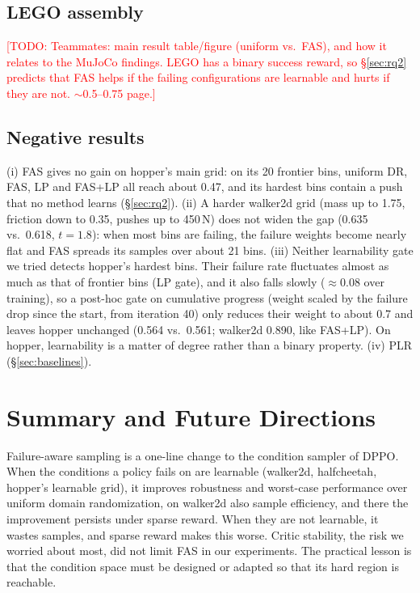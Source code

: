 \documentclass{article}
\newcommand{\todo}[1]{\textcolor{red}{[TODO: #1]}}
\newcommand{\fas}{\textsc{FAS}}
\begin{document}
\subsection{LEGO assembly}
\label{sec:lego}
\todo{Teammates: main result table/figure (uniform vs.\ \fas{}), and how it relates to the MuJoCo findings. LEGO has a binary success reward, so \S\ref{sec:rq2} predicts that \fas{} helps if the failing configurations are learnable and hurts if they are not. $\sim$0.5--0.75 page.}

\subsection{Negative results}
\label{sec:negative}
(i) \fas{} gives no gain on hopper's main grid: on its 20 frontier bins, uniform DR, \fas{}, LP and \fas{}+LP all reach about 0.47, and its hardest bins contain a push that no method learns (\S\ref{sec:rq2}).
(ii) A harder walker2d grid (mass up to 1.75, friction down to 0.35, pushes up to 450\,N) does not widen the gap (0.635 vs.\ 0.618, $t=1.8$): when most bins are failing, the failure weights become nearly flat and \fas{} spreads its samples over about 21 bins.
(iii) Neither learnability gate we tried detects hopper's hardest bins. Their failure rate fluctuates almost as much as that of frontier bins (LP gate), and it also falls slowly ($\approx$0.08 over training), so a post-hoc gate on cumulative progress (weight scaled by the failure drop since the start, from iteration 40) only reduces their weight to about 0.7 and leaves hopper unchanged (0.564 vs.\ 0.561; walker2d 0.890, like \fas{}+LP). On hopper, learnability is a matter of degree rather than a binary property.
(iv) PLR (\S\ref{sec:baselines}).

\section{Summary and Future Directions}
\label{sec:conclusion}

Failure-aware sampling is a one-line change to the condition sampler of DPPO. When the conditions a policy fails on are learnable (walker2d, halfcheetah, hopper's learnable grid), it improves robustness and worst-case performance over uniform domain randomization, on walker2d also sample efficiency, and there the improvement persists under sparse reward.
When they are not learnable, it wastes samples, and sparse reward makes this worse.
Critic stability, the risk we worried about most, did not limit \fas{} in our experiments.
The practical lesson is that the condition space must be designed or adapted so that its hard region is reachable.
\end{document}
